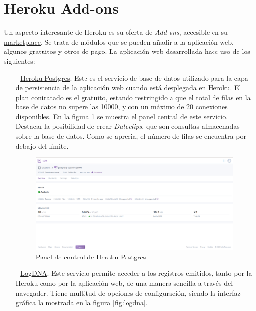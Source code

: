 \documentclass[a4paper,12pt,twoside,openright]{report}
\begin{document}
    \section{Heroku Add-ons} \label{sec:addons}
    Un aspecto interesante de Heroku es su oferta de \emph{Add-ons}, accesible en su \href{https://elements.heroku.com/addons}{marketplace}. Se trata de módulos que se pueden añadir a la aplicación web, algunos gratuitos y otros de pago. La aplicación web desarrollada hace uso de los siguientes:
    
    \begin{itemize}
       	\item[-] \href{https://elements.heroku.com/addons/heroku-postgresql}{Heroku Postgres}. Este es el servicio de base de datos utilizado para la capa de persistencia de la aplicación web cuando está desplegada en Heroku. El plan contratado es el gratuito, estando restringido a que el total de filas en la base de datos no supere las 10000, y con un máximo de 20 conexiones disponibles. En la figura \ref{fig:herokupostgres} se muestra el panel central de este servicio. Destacar la posibilidad de crear \emph{Dataclips}, que son consultas almacenadas sobre la base de datos. Como se aprecia, el número de filas se encuentra por debajo del límite.
       	
       	\begin{figure}[hbt!]
       		\centering
       		\includegraphics[width=\textwidth,keepaspectratio]{herokupostgres}
       		\caption{Panel de control de Heroku Postgres}
       		\label{fig:herokupostgres}
       	\end{figure}
       	
       	\item[-] \href{https://elements.heroku.com/addons/logdna}{LogDNA}. Este servicio permite acceder a los registros emitidos, tanto por la Heroku como por la aplicación web, de una manera sencilla a través del navegador. Tiene multitud de opciones de configuración, siendo la interfaz gráfica la mostrada en la figura \ref{fig:logdna}.
       	

\end{itemize}
\end{document}
